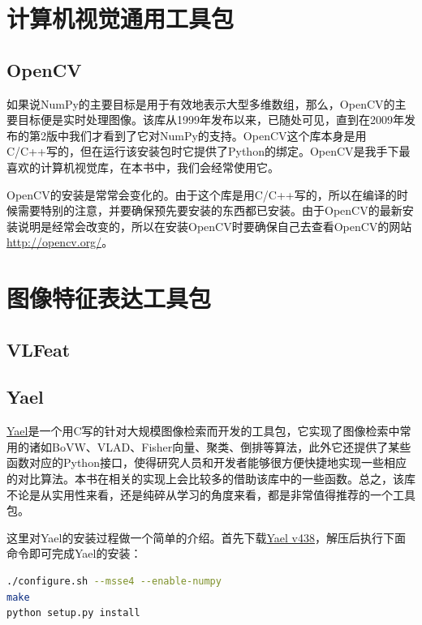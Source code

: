 \documentclass[color=cyan,mathpazo,titlestyle=hang]{elegantbook}
\begin{document}
\section{计算机视觉通用工具包}

\subsection{OpenCV}

如果说NumPy的主要目标是用于有效地表示大型多维数组，那么，OpenCV的主要目标便是实时处理图像。该库从1999年发布以来，已随处可见，直到在2009年发布的第2版中我们才看到了它对NumPy的支持。OpenCV这个库本身是用C/C++写的，但在运行该安装包时它提供了Python的绑定。OpenCV是我手下最喜欢的计算机视觉库，在本书中，我们会经常使用它。

OpenCV的安装是常常会变化的。由于这个库是用C/C++写的，所以在编译的时候需要特别的注意，并要确保预先要安装的东西都已安装。由于OpenCV的最新安装说明是经常会改变的，所以在安装OpenCV时要确保自己去查看OpenCV的网站\url{http://opencv.org/}。

\section{图像特征表达工具包}

\subsection{VLFeat}

\subsection{Yael}

\href{http://yael.gforge.inria.fr/}{Yael}是一个用C写的针对大规模图像检索而开发的工具包，它实现了图像检索中常用的诸如BoVW、VLAD、Fisher向量、聚类、倒排等算法，此外它还提供了某些函数对应的Python接口，使得研究人员和开发者能够很方便快捷地实现一些相应的对比算法。本书在相关的实现上会比较多的借助该库中的一些函数。总之，该库不论是从实用性来看，还是纯碎从学习的角度来看，都是非常值得推荐的一个工具包。

这里对Yael的安装过程做一个简单的介绍。首先下载\href{https://gforge.inria.fr/frs/?group_id=2151}{Yael v438}，解压后执行下面命令即可完成Yael的安装：

\begin{lstlisting}[language=bash]
./configure.sh --msse4 --enable-numpy
make
python setup.py install
\end{lstlisting}
\end{document}
